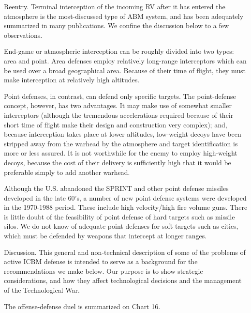 Reentry. Terminal interception of the incoming RV after it has entered the atmosphere is the most-discussed type of ABM system, and has been adequately summarized in many publications. We confine the discussion below to a few observations.

End-game or atmospheric interception can be roughly divided into two types: area and point. Area defenses employ relatively long-range interceptors which can be used over a broad geographical area. Because of their time of flight, they must make interception at relatively high altitudes.

Point defenses, in contrast, can defend only specific targets. The point-defense concept, however, has two advantages. It may make use of somewhat smaller interceptors (although the tremendous accelerations required because of their short time of flight make their design and construction very complex); and, because interception takes place at lower altitudes, low-weight decoys have been stripped away from the warhead by the atmosphere and target identification is more or less assured. It is not worthwhile for the enemy to employ high-weight decoys, because the cost of their delivery is sufficiently high that it would be preferable simply to add another warhead.

\begin{mdframed}[backgroundcolor=black!10]
Although the U.S. abandoned the SPRINT and other point defense missiles developed in the late 60's, a number of new point defense systems were developed in the 1970-1988 period. These include high velocity/high fire volume guns. There is little doubt of the feasibility of point defense of hard targets such as missile silos. We do not know of adequate point defenses for soft targets such as cities, which must be defended by weapons that intercept at longer ranges.
\end{mdframed}

Discussion. This general and non-technical description of some of the problems of active ICBM defense is intended to serve as a background for the recommendations we make below. Our purpose is to show strategic considerations, and how they affect technological decisions and the management of the Technological War.

The offense-defense duel is summarized on Chart 16.

